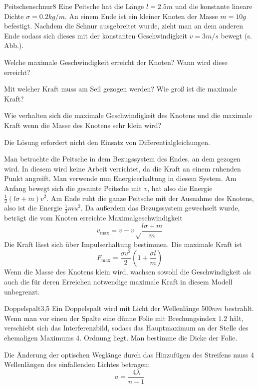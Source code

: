 \begin{problem}{Peitschenschnur}{8}
Eine Peitsche hat die Länge $l=2.5 \unit{m}$ und die konstante lineare Dichte $\sigma = 0.2 \unit{kg/m}$. An einem Ende ist ein kleiner Knoten der Masse $m = 10 \unit{g}$ befestigt. Nachdem die Schnur ausgebreitet wurde, zieht man an dem anderen Ende sodass sich dieses mit der konstanten Geschwindigkeit $v = 3 \unit{m/s}$ bewegt (s. Abb.).
\begin{abcenum}
\item Welche maximale Geschwindigkeit erreicht der Knoten? Wann wird diese erreicht?
\item Mit welcher Kraft muss am Seil gezogen werden? Wie groß ist die maximale Kraft?
\item Wie verhalten sich die maximale Geschwindigkeit des Knotens und die maximale Kraft wenn die Masse des Knotens sehr klein wird?
\end{abcenum}
\hinweis Die Lösung erfordert nicht den Einsatz von Differentialgleichungen.
\begin{solution}
Man betrachte die Peitsche in dem Bezugssystem des Endes, an dem gezogen wird. In diesem wird keine Arbeit verrichtet, da die Kraft an einem ruhenden Punkt angreift. Man verwende nun Energieerhaltung in diesem System. Am Anfang bewegt sich die gesamte Peitsche mit $v$, hat also die Energie $\frac12 (l\sigma +m) v^2$. Am Ende ruht die ganze Peitsche mit der Ausnahme des Knotens, also ist die Energie $\frac12 m u^2$. Da außerdem das Bezugssystem gewechselt wurde, beträgt die vom Knoten erreichte Maximalgeschwindigkeit
\[
v_\mathrm{max} = v - v \sqrt\frac{l\sigma+m}{m}
\]
Die Kraft lässt sich über Impulserhaltung bestimmen. Die maximale Kraft ist
\[
F_\mathrm{max} = \frac{\sigma v^2}{2} \left( 1 + \frac{\sigma l}{m} \right)
\]
Wenn die Masse des Knotens klein wird, wachsen sowohl die Geschwindigkeit als auch die für deren Erreichen notwendige maximale Kraft in diesem Modell unbegrenzt.
\end{solution}
\end{problem}


\begin{problem}{Doppelspalt}{3,5}
Ein Doppelspalt wird mit Licht der Wellenlänge $500 \unit{nm}$ bestrahlt. Wenn man vor einen der Spalte eine dünne Folie mit Brechungsindex $1.2$ hält, verschiebt sich das Interferenzbild, sodass das Hauptmaximum an der Stelle des ehemaligen Maximums 4. Ordnung liegt. Man bestimme die Dicke der Folie.
\begin{solution}
Die Änderung der optischen Weglänge durch das Hinzufügen des Streifens muss 4 Wellenlängen des einfallenden Lichtes betragen:
\[
a= \frac{4 \lambda}{n-1}
\]
\end{solution}
\end{problem}

